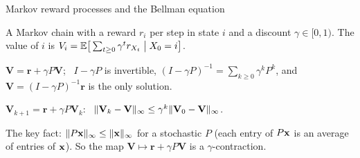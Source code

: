 \documentclass[aspectratio=1610,11pt]{beamer}
\begin{document}

\begin{frame}{Markov reward processes and the Bellman equation}
    \begin{definition}
        \small A Markov chain with a reward $r_i$ per step in state $i$ and a discount $\gamma \in [0, 1)$. The value of $i$ is $V_i = \mathbb{E}\big[\sum_{t \geq 0}\gamma^tr_{X_t} \bigm| X_0 = i\big]$.
    \end{definition}
    \begin{theorem}
        \small $\mathbf{V} = \mathbf{r} + \gamma P\mathbf{V}$; \ $I - \gamma P$ is invertible, $(I - \gamma P)^{-1} = \sum_{k \geq 0}\gamma^kP^k$, and $\mathbf{V} = (I - \gamma P)^{-1}\mathbf{r}$ is the only solution.
    \end{theorem}
    \begin{proposition}
        \small $\mathbf{V}_{k+1} = \mathbf{r} + \gamma P\mathbf{V}_k$: \ $\lVert \mathbf{V}_k - \mathbf{V} \rVert_\infty \leq \gamma^k\lVert \mathbf{V}_0 - \mathbf{V} \rVert_\infty$.
    \end{proposition}
    \small The key fact: $\lVert P\mathbf{x} \rVert_\infty \leq \lVert \mathbf{x} \rVert_\infty$ for a stochastic $P$ (each entry of $P\mathbf{x}$ is an average of entries of $\mathbf{x}$). So the map $\mathbf{V} \mapsto \mathbf{r} + \gamma P\mathbf{V}$ is a $\gamma$-contraction.
\end{frame}

\end{document}

